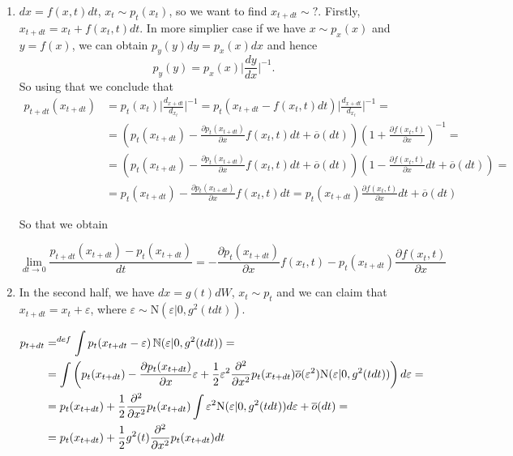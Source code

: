 \begin{enumerate} 
    \item $dx = f(x, t) dt$, $x_t \sim p_t(x_t)$, so we want to find $x_{t + dt} \sim ?$. Firstly, $x_{t + dt} = x_t + f(x_t, t) dt$. In more simplier case if we have $x \sim p_x (x)$ and $y = f(x)$, we can obtain $p_y(y) dy = p_x(x) dx$ and hence $$p_y(y) = p_x(x) \vert \frac{dy}{dx} \vert^{-1}.$$ So using that we conclude that 
    \begin{equation*}
        \begin{aligned}
            p_{t + dt} (x_{t + dt}) &= p_t(x_t) \vert \frac{d_{x + dt}}{d_{x_t}} \vert^{-1} = p_t(x_{t + dt} - f(x_t, t)dt) \vert \frac{d_{x + dt}}{d_{x_t}} \vert^{-1} = \\ 
            &= \left( p_t(x_{t + dt}) - \frac{\partial p_t(x_{t + dt})}{\partial x} f(x_t, t) dt + \overline{o}(dt) \right) \left( 1 + \frac{\partial f(x_t, t)}{\partial x} \right)^{-1} = \\ 
            &= \left( p_t(x_{t + dt}) - \frac{\partial p_t(x_{t + dt})}{\partial x} f(x_t, t) dt + \overline{o}(dt) \right) \left( 1 - \frac{\partial f(x_t, t)}{\partial x} dt + \overline{o}(dt) \right) = \\ 
            &= p_t(x_{t + dt}) - \frac{\partial p_t(x_{t + dt})}{\partial x} f(x_t, t) dt = p_t(x_{t + dt}) \frac{\partial f(x_t, t)}{\partial x} dt + \overline{o}(dt)
        \end{aligned}
    \end{equation*}

    So that we obtain 

    \[
        \lim_{dt \to 0} \frac{p_{t + dt} (x_{t + dt}) - p_t(x_{t + dt})}{dt} = - \frac{\partial p_t(x_{t + dt})}{\partial x} f(x_t, t) - p_t(x_{t + dt}) \frac{\partial f(x_t, t)}{\partial x}
    \]
    \item In the second half, we have $dx = g(t) dW$, $x_t \sim p_t$ and we can claim that $x_{t + dt} = x_t + \varepsilon$, where $\varepsilon \sim \mathrm{N}(\varepsilon \vert 0, g^2(t dt))$. 
    
    \begin{equation*}
        \begin{aligned}
            p_{t + dt} &=^{def} \int p_{t} (x_{t + dt} - \varepsilon) \operatorname{\mathbb{N}} (\varepsilon \vert 0, g^2(t dt)) = \\ 
            &= \int \left( p_t(x_{t + dt}) - \frac{\partial p_t(x_{t + dt})}{\partial x} \varepsilon + \frac{1}{2}\varepsilon^2 \frac{\partial^2}{\partial x^2} p_t (x_{t + dt}) \overline{o}(\varepsilon^2) \mathrm{N}(\varepsilon \vert 0, g^2(t dt)) \right) d \varepsilon = \\ 
            &= p_t (x_{t + dt}) + \frac{1}{2} \frac{\partial^2}{\partial x^2} p_t(x_{t + dt}) \int \varepsilon^2 \mathrm{N}(\varepsilon \vert 0, g^2(t dt)) d \varepsilon + \overline{o}(dt) =\\ 
            &= p_{t}(x_{t + dt}) + \frac{1}{2} g^2(t) \frac{\partial^2}{\partial x^2} p_t(x_{t + dt}) dt
       \end{aligned}
    \end{equation*}


\end{enumerate}
